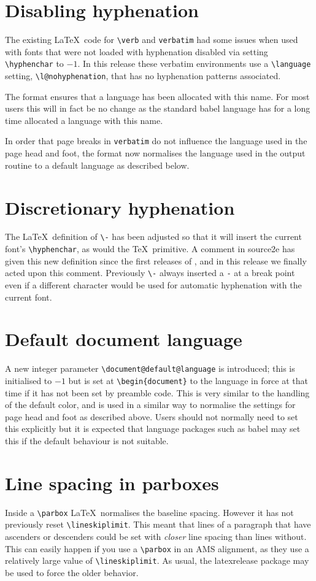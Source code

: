\documentclass{ltnews}
\begin{document}
\section{Disabling hyphenation}
The existing \LaTeX\ code for \verb|\verb| and \verb|verbatim| had some
issues when used with fonts that were not loaded with hyphenation
disabled via setting \verb|\hyphenchar| to $-1$. In this release these
verbatim environments use a \verb|\language| setting,
\verb|\l@nohyphenation|, that has no hyphenation patterns associated. 

The format ensures that  a language has been allocated with this name.
For most users this will in fact be no change as the standard
\textsf{babel} language has for a long time allocated a language with
this name.

In order that page breaks in \texttt{verbatim} do not influence the
language used in the page head and foot, the format now normalises the
language used in the output routine to a default language as described
below.
 
\section{Discretionary hyphenation}
The \LaTeX\ definition of \verb|\-| has been adjusted so that it will
insert the current font's \verb|\hyphenchar|, as would the
\TeX\ primitive. A comment in \textsf{source2e} has given
this new definition since the first releases of \LaTeXe, and in this
release we finally acted upon this comment. Previously \verb|\-|
always inserted a \texttt{-} at a break point even if a different
character would be used for automatic hyphenation with the current font.

\section{Default document language}

A new integer parameter \verb|\document@default@language| is
introduced; this is initialised to $-1$ but is set at
\verb|\begin{document}| to the language in force at that time if it
  has not been set by preamble code. This is very similar to the
  handling of the default color, and is used in a similar way to
  normalise the settings for page head and foot as described above.
Users should not normally need to set this explicitly but it is expected that
language packages such as \textsf{babel} may set this if the default
behaviour is not suitable.

\section{Line spacing in parboxes}
Inside a \verb|\parbox| 
\LaTeX\ normalises the baseline spacing. However it has not
previously reset \verb|\lineskiplimit|. This meant that
lines of a paragraph that have ascenders or descenders could be set
with \emph{closer} line spacing than lines without. This can easily
happen if you use a \verb|\parbox| in an AMS alignment, as they use a
relatively large value of \verb|\lineskiplimit|.
As usual, the \textsf{latexrelease} package may be used to
force the older behavior.
  
\end{document}
